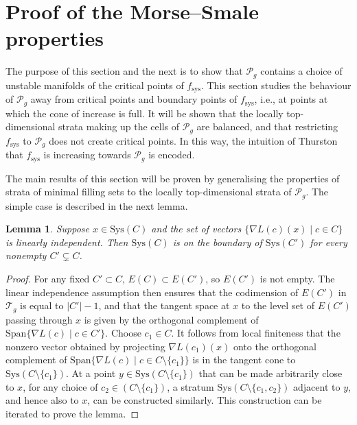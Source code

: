 \documentclass[pdftex]{sigma}
\numberwithin{equation}{section}
\newtheorem{Lemma}[Theorem]{Lemma}
\begin{document}
\section{Proof of the Morse--Smale properties}
\label{mainproof}

The purpose of this section and the next is to show that $\mathcal{P}_{g}$ contains a choice of unstable manifolds of the critical points of $f_{\mathrm{sys}}$. This section studies the behaviour of $\mathcal{P}_{g}$ away from critical points and boundary points of $f_{\mathrm{sys}}$, i.e., at points at which the cone of increase is full. It will be shown that the locally top-dimensional strata making up the cells of $\mathcal{P}_{g}$ are balanced, and that restricting $f_{\mathrm{sys}}$ to $\mathcal{P}_{g}$ does not create critical points. In this way, the intuition of Thurston that $f_{\mathrm{sys}}$ is increasing towards $\mathcal{P}_{g}$ is encoded.

The main results of this section will be proven by generalising the properties of strata of minimal filling sets to the locally top-dimensional strata of $\mathcal{P}_{g}$. The simple case is described in the next lemma.

\begin{Lemma}
\label{linearlyindependent}
Suppose $x\in \mathrm{Sys}(C)$ and the set of vectors $\{\nabla L(c)(x) \mid c\in C\}$ is linearly independent. Then $\mathrm{Sys}(C)$ is on the boundary of $\mathrm{Sys}(C')$ for every nonempty $C'\subsetneq C$.
\end{Lemma}
\begin{proof}
For any fixed $C'\subset C$, $E(C)\subset E(C')$, so $E(C')$ is not empty. The linear independence assumption then ensures that the codimension of $E(C')$ in $\mathcal{T}_{g}$ is equal to $|C'|-1$, and that the tangent space at $x$ to the level set of $E(C')$ passing through $x$ is given by the orthogonal complement of $\mathrm{Span}\{\nabla L(c) \mid c\in C'\}$. Choose $c_{1}\in C$. It follows from local finiteness that the nonzero vector obtained by projecting $\nabla L(c_{1})(x)$ onto the orthogonal complement of $\mathrm{Span}\{\nabla L(c) \mid c\in C\setminus \{c_{1}\}\}$ is in the tangent cone to $\mathrm{Sys}(C\setminus\{c_{1}\})$. At a point $y\in \mathrm{Sys}(C\setminus\{c_{1}\})$ that can be made arbitrarily close to $x$, for any choice of $c_{2}\in (C\setminus\{c_{1}\})$, a stratum $\mathrm{Sys}(C\setminus\{c_{1},c_{2}\})$ adjacent to $y$, and hence also to $x$, can be constructed similarly. This construction can be iterated to prove the lemma.
\end{proof}
\end{document}
